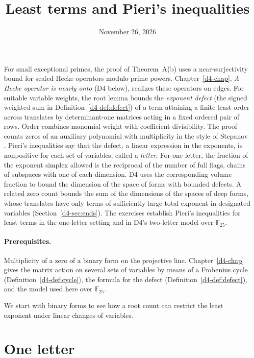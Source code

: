 \documentclass[reqno]{amsart}
\title{Least terms and Pieri's inequalities}
\author{}
\date{November 26, 2026}
\newcounter{chap}
\theoremstyle{plain}
\theoremstyle{definition}
\theoremstyle{remark}
\newcommand{\F}{\mathbb{F}}
\begin{document}
\maketitle
{}\label{chap}

For small exceptional primes, the proof of Theorem~A(b) uses a near-surjectivity bound for scaled Hecke operators modulo prime powers.  Chapter~\ref{d4-chap}, \emph{A Hecke operator is nearly onto} (D4 below), realizes these operators on edges.  For suitable variable weights, the root lemma bounds the \emph{exponent defect} (the signed weighted sum in Definition~\ref{d4-def:defect}) of a term attaining a finite least order across translates by determinant-one matrices acting in a fixed ordered pair of rows.  Order combines monomial weight with coefficient divisibility.  The proof counts zeros of an auxiliary polynomial with multiplicity in the style of Stepanov \cite[\S I]{Bo}.  Pieri's inequalities say that the defect, a linear expression in the exponents, is nonpositive for each set of variables, called a \emph{letter}.  For one letter, the fraction of the exponent simplex allowed is the reciprocal of the number of full flags, chains of subspaces with one of each dimension.  D4 uses the corresponding volume fraction to bound the dimension of the space of forms with bounded defects.  A related zero count bounds the sum of the dimensions of the spaces of deep forms, whose translates have only terms of sufficiently large total exponent in designated variables (Section~\ref{d4-sec:ends}).  The exercises establish Pieri's inequalities for least terms in the one-letter setting and in D4's two-letter model over \(\F_{25}\).

\paragraph{Prerequisites.}
Multiplicity of a zero of a binary form on the projective line.  Chapter~\ref{d4-chap} gives the matrix action on several sets of variables by means of a Frobenius cycle (Definition~\ref{d4-def:cycle}), the formula for the defect (Definition~\ref{d4-def:defect}), and the model used here over \(\F_{25}\).

We start with binary forms to see how a root count can restrict the least exponent under linear changes of variables.

\section{One letter}\label{sec:one-letter}
\end{document}
